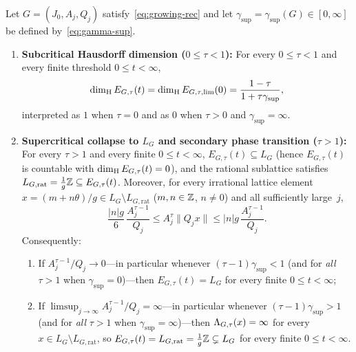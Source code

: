 \begin{theorem}\label{thm:growing-rec-dim-phase}
Let $G=(J_0,A_j,Q_j)$ satisfy~\eqref{eq:growing-rec} and let
$\gamma_{\sup}=\gamma_{\sup}(G)\in[0,\infty]$ be defined by~\eqref{eq:gamma-sup}.
\begin{enumerate}[label=(\roman*),leftmargin=2.2em]
\item \textbf{Subcritical Hausdorff dimension ($0\le\tau<1$):}
For every $0\le\tau<1$ and every finite threshold $0\le t<\infty$,
\begin{equation}\label{eq:growing-subcritical-dim}
\dim_{\mathrm{H}} E_{G,\tau}(t)
=\dim_{\mathrm{H}} E_{G,\tau,\mathrm{lim}}(0)
=\frac{1-\tau}{1+\tau\gamma_{\sup}},
\end{equation}
interpreted as $1$ when $\tau=0$ and as $0$ when $\tau>0$ and $\gamma_{\sup}=\infty$.
\item \textbf{Supercritical collapse to $L_G$ and secondary phase transition ($\tau>1$):}
For every $\tau>1$ and every finite $0\le t<\infty$, $E_{G,\tau}(t)\subseteq L_G$
(hence $E_{G,\tau}(t)$ is countable with $\dim_{\mathrm{H}} E_{G,\tau}(t)=0$), and the
rational sublattice satisfies $L_{G,\mathrm{rat}}=\frac{1}{g}\mathbb{Z}\subseteq E_{G,\tau}(t)$.
Moreover, for every irrational lattice element $x=(m+n\theta)/g\in L_G\setminus L_{G,\mathrm{rat}}$
($m,n\in\mathbb{Z}$, $n\ne0$) and all sufficiently large~$j$,
\begin{equation}\label{eq:growing-supercritical-sandwich}
\frac{|n|g}{6}\,\frac{A_j^{\tau-1}}{Q_j}
\le A_j^\tau\|Q_j x\|
\le |n|g\,\frac{A_j^{\tau-1}}{Q_j}.
\end{equation}
Consequently:
\begin{enumerate}[label=(\alph*),leftmargin=1.6em]
\item If $A_j^{\tau-1}/Q_j\to0$---in particular whenever
$(\tau-1)\gamma_{\sup}<1$ (and for \emph{all} $\tau>1$ when $\gamma_{\sup}=0$)---then
$E_{G,\tau}(t)=L_G$ for every finite $0\le t<\infty$;
\item If $\limsup_{j\to\infty}A_j^{\tau-1}/Q_j=\infty$---in particular whenever
$(\tau-1)\gamma_{\sup}>1$ (and for \emph{all} $\tau>1$ when $\gamma_{\sup}=\infty$)---then
$\Lambda_{G,\tau}(x)=\infty$ for every $x\in L_G\setminus L_{G,\mathrm{rat}}$, so
$E_{G,\tau}(t)=L_{G,\mathrm{rat}}=\frac{1}{g}\mathbb{Z}\subsetneq L_G$ for every finite
$0\le t<\infty$.
\end{enumerate}
\end{enumerate}
\end{theorem}

